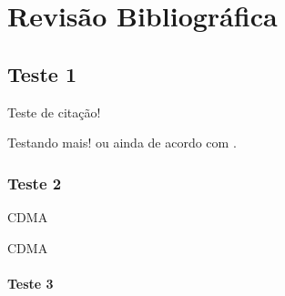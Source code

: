 \chapter{Revisão Bibliográfica}
\thispagestyle{capitulos}
\pagestyle{capitulos}

\section{Teste 1}

Teste de citação! \cite{sadiku}

Testando mais! \cite{prodist2022} ou ainda de acordo com \textcites{prodist2022}. 

\subsection{Teste 2}

\Ac{CDMA}

\blindtext

\Ac{CDMA}

\subsubsection{Teste 3}

\Blindtext[5][2]